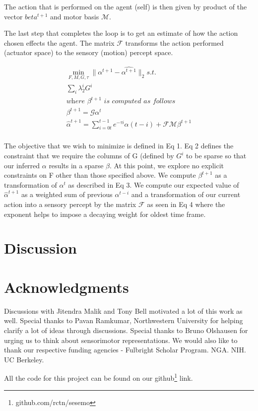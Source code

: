 \documentclass[conference]{IEEEtran}
\begin{document}
The action that is performed on the agent (self) is then given by product of the vector $beta^{t+1}$ and motor basis $\mathcal{M}$. 

The last step that completes the loop is to get an estimate of how the action chosen effects the agent. The matrix $\mathcal{F}$ transforms the action performed (actuator space) to the sensory (motion) percept space.

\begin{eqnarray}
\min_{F,M,G,\tau} \| \alpha^{t+1} - \hat{\alpha^{t+1}} \|_{2} \textit{s.t.} \\ 
\sum_{i} \lambda_2^{i} G^{i}  \\
 \textit{where $\beta^{t+1}$ is computed as follows} \nonumber \\
\beta^{t+1} = \mathcal{G} \alpha^{t}\\
\hat{\alpha}^{t+1} = \sum_{i=0t}^{t-1}  e^{-\tau i} \alpha(t-i) + \mathcal{F}\mathcal{M}\beta^{t+1} \\
\end{eqnarray}

The objective that we wish to minimize is defined in Eq 1. Eq 2 defines the constraint that we require the columns of G (defined by $G^{i}$ to be sparse so that our inferred $\alpha$ results in a sparse $\beta$. At this point, we explore no explicit constraints on F other than those specified above. We compute $\beta^{t+1}$ as a transformation of $\alpha^{t}$ as described in Eq 3. We compute our expected value of $\hat{\alpha}^{t+1}$ as a weighted sum of previous $\alpha^{t-i}$ and a transformation of our current action into a sensory percept by the matrix $\mathcal{F}$ as seen in Eq 4 where the exponent helps to impose a decaying weight for oldest time frame. 

\section{Discussion}




\section{ Acknowledgments} 

Discussions with Jitendra Malik and Tony Bell motivated a lot of this work as well. Special thanks to Pavan Ramkumar, Northwestern University for helping clarify a lot of ideas through discussions. Special thanks to Bruno Olshausen for urging us to think about sensorimotor representations. We would also like to thank our respective funding agencies - Fulbright Scholar Program. NGA. NIH. UC Berkeley.

All the code for this project can be found on our github\footnote{github.com/rctn/sesemo} link.




\end{document}
